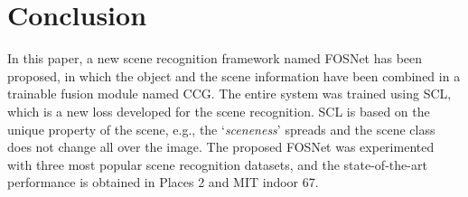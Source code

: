 \documentclass[journal,comsoc]{IEEEtran}
\begin{document}
\section{Conclusion}
\label{s6}
In this paper, a new scene recognition framework named FOSNet has been proposed, in which the object and the scene information have been combined in a trainable fusion module named CCG. The entire system was trained using SCL, which is a new loss developed for the scene recognition. SCL is based on the unique property of the scene, e.g., the `\textit{sceneness}' spreads and the scene class does not change all over the image. The proposed FOSNet was experimented with three most popular scene recognition datasets, and the state-of-the-art performance is obtained in Places 2 and MIT indoor 67.






















\ifCLASSOPTIONcaptionsoff
  \newpage
\fi
\end{document}
